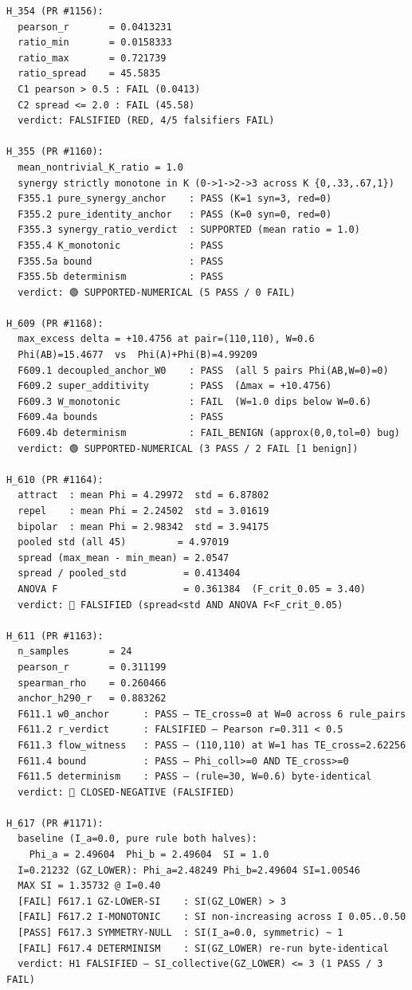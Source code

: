 \documentclass[11pt,a4paper]{article}
\begin{document}
\begin{lstlisting}[basicstyle=\ttfamily\scriptsize,frame=single,xleftmargin=0pt,breaklines=true]
H_354 (PR #1156):
  pearson_r       = 0.0413231
  ratio_min       = 0.0158333
  ratio_max       = 0.721739
  ratio_spread    = 45.5835
  C1 pearson > 0.5 : FAIL (0.0413)
  C2 spread <= 2.0 : FAIL (45.58)
  verdict: FALSIFIED (RED, 4/5 falsifiers FAIL)

H_355 (PR #1160):
  mean_nontrivial_K_ratio = 1.0
  synergy strictly monotone in K (0->1->2->3 across K {0,.33,.67,1})
  F355.1 pure_synergy_anchor    : PASS (K=1 syn=3, red=0)
  F355.2 pure_identity_anchor   : PASS (K=0 syn=0, red=0)
  F355.3 synergy_ratio_verdict  : SUPPORTED (mean ratio = 1.0)
  F355.4 K_monotonic            : PASS
  F355.5a bound                 : PASS
  F355.5b determinism           : PASS
  verdict: 🟢 SUPPORTED-NUMERICAL (5 PASS / 0 FAIL)

H_609 (PR #1168):
  max_excess delta = +10.4756 at pair=(110,110), W=0.6
  Phi(AB)=15.4677  vs  Phi(A)+Phi(B)=4.99209
  F609.1 decoupled_anchor_W0    : PASS  (all 5 pairs Phi(AB,W=0)=0)
  F609.2 super_additivity       : PASS  (Δmax = +10.4756)
  F609.3 W_monotonic            : FAIL  (W=1.0 dips below W=0.6)
  F609.4a bounds                : PASS
  F609.4b determinism           : FAIL_BENIGN (approx(0,0,tol=0) bug)
  verdict: 🟢 SUPPORTED-NUMERICAL (3 PASS / 2 FAIL [1 benign])

H_610 (PR #1164):
  attract  : mean Phi = 4.29972  std = 6.87802
  repel    : mean Phi = 2.24502  std = 3.01619
  bipolar  : mean Phi = 2.98342  std = 3.94175
  pooled std (all 45)         = 4.97019
  spread (max_mean - min_mean) = 2.0547
  spread / pooled_std          = 0.413404
  ANOVA F                      = 0.361384  (F_crit_0.05 = 3.40)
  verdict: 🔴 FALSIFIED (spread<std AND ANOVA F<F_crit_0.05)

H_611 (PR #1163):
  n_samples       = 24
  pearson_r       = 0.311199
  spearman_rho    = 0.260466
  anchor_h290_r   = 0.883262
  F611.1 w0_anchor      : PASS — TE_cross=0 at W=0 across 6 rule_pairs
  F611.2 r_verdict      : FALSIFIED — Pearson r=0.311 < 0.5
  F611.3 flow_witness   : PASS — (110,110) at W=1 has TE_cross=2.62256
  F611.4 bound          : PASS — Phi_coll>=0 AND TE_cross>=0
  F611.5 determinism    : PASS — (rule=30, W=0.6) byte-identical
  verdict: 🔴 CLOSED-NEGATIVE (FALSIFIED)

H_617 (PR #1171):
  baseline (I_a=0.0, pure rule both halves):
    Phi_a = 2.49604  Phi_b = 2.49604  SI = 1.0
  I=0.21232 (GZ_LOWER): Phi_a=2.48249 Phi_b=2.49604 SI=1.00546
  MAX SI = 1.35732 @ I=0.40
  [FAIL] F617.1 GZ-LOWER-SI    : SI(GZ_LOWER) > 3
  [FAIL] F617.2 I-MONOTONIC    : SI non-increasing across I 0.05..0.50
  [PASS] F617.3 SYMMETRY-NULL  : SI(I_a=0.0, symmetric) ~ 1
  [FAIL] F617.4 DETERMINISM    : SI(GZ_LOWER) re-run byte-identical
  verdict: H1 FALSIFIED — SI_collective(GZ_LOWER) <= 3 (1 PASS / 3 FAIL)


\end{lstlisting}
\end{document}
